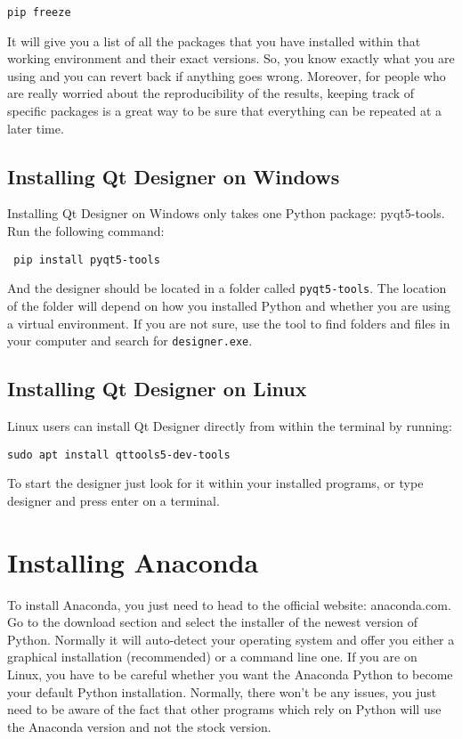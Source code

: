 \begin{verbatim}
pip freeze
\end{verbatim}

It will give you a list of all the packages that you have installed within that working environment and their exact versions. So, you know exactly what you are using and you can revert back if anything goes wrong. Moreover, for people who are really worried about the reproducibility of the results, keeping track of specific packages is a great way to be sure that everything can be repeated at a later time.

\subsection{Installing Qt Designer on Windows}
Installing Qt Designer on Windows only takes one Python package: pyqt5-tools. Run the following command:

\begin{verbatim}
 pip install pyqt5-tools
\end{verbatim}

And the designer should be located in a folder called \texttt{pyqt5-tools}. The location of the folder will depend on how you installed Python and whether you are using a virtual environment. If you are not sure, use the tool to find folders and files in your computer and search for \texttt{designer.exe}.

\subsection{Installing Qt Designer on Linux}
Linux users can install Qt Designer directly from within the terminal by running:

\begin{verbatim}
sudo apt install qttools5-dev-tools
\end{verbatim}

To start the designer just look for it within your installed programs, or type designer and press enter on a terminal. 

\section{Installing Anaconda}
To install Anaconda, you just need to head to the official website: anaconda.com. Go to the download section and select the installer of the newest version of Python. Normally it will auto-detect your operating system and offer you either a graphical installation (recommended) or a command line one. If you are on Linux, you have to be careful whether you want the Anaconda Python to become your default Python installation. Normally, there won't be any issues, you just need to be aware of the fact that other programs which rely on Python will use the Anaconda version and not the stock version. 

